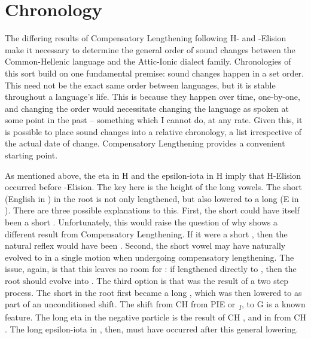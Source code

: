 \section{Chronology}\label{sec:Chrono}
The differing results of Compensatory Lengthening following H- and \W-Elision make it necessary to determine the general order of sound changes between the Common-Hellenic language and the Attic-Ionic dialect family. Chronologies of this sort build on one fundamental premise: sound changes happen in a set order. This need not be the exact same order between languages, but it is stable throughout a language's life. This is because they happen over time, one-by-one, and changing the order would necessitate changing the language as spoken at some point in the past -- something which I cannot do, at any rate. Given this, it is possible to place sound changes into a relative chronology, a list irrespective of the actual date of change. Compensatory Lengthening provides a convenient starting point.

As mentioned above, the eta  in H  and the epsilon-iota  in H  imply that H-Elision occurred before \W-Elision. The key here is the height of the long vowels. The short  (English  in ) in the root  is not only lengthened, but also lowered to a long  (E  in ). There are three possible explanations to this. First, the short  could have itself been a short . Unfortunately, this would raise the question of why  shows a different result from Compensatory Lengthening. If it were a short , then the natural reflex would have been . Second, the short vowel  may have naturally evolved to  in a single motion when undergoing compensatory lengthening. The issue, again, is that this leaves no room for : if  lengthened directly to , then the root  should evolve into . The third option is that  was the result of a two step process. The short  in the root  first became a long , which was then lowered to  as part of an unconditioned shift. The shift from CH  from PIE  or \textit{\textsubscript{1}}, to G  is a known feature. The long eta  in the negative particle  is the result of CH , and in  from CH .\autocite[51]{Smyth_2013} The long epsilon-iota in , then, must have occurred after this general lowering. 

